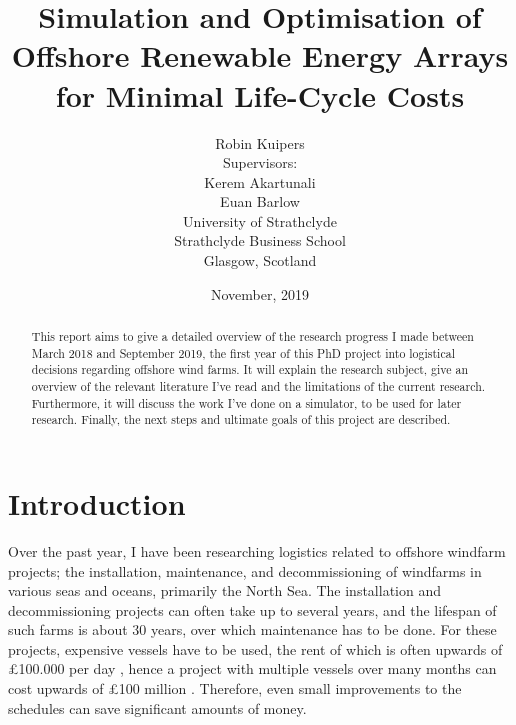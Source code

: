 \documentclass[a4paper,12pt]{article}
\begin{document}
\title{Simulation and Optimisation of Offshore Renewable Energy Arrays for Minimal Life-Cycle Costs}
\author{Robin Kuipers \\[1cm] Supervisors: \\ Kerem Akartunali \\ Euan Barlow\\[2cm] University of Strathclyde \\ Strathclyde Business School \\ {\small Glasgow, Scotland}}
\date{November, 2019}

\maketitle

\pagebreak

\begin{abstract}
This report aims to give a detailed overview of the research progress I made between March 2018 and September 2019, the first year of this PhD project into logistical decisions regarding offshore wind farms. It will explain the research subject, give an overview of the relevant literature I've read and the limitations of the current research. Furthermore, it will discuss the work I've done on a simulator, to be used for later research. Finally, the next steps and ultimate goals of this project are described. 
\end{abstract}

\pagebreak

\tableofcontents

\pagebreak

\section{Introduction} \label{s:intro}
Over the past year, I have been researching logistics related to offshore windfarm projects; the installation, maintenance, and decommissioning of windfarms in various seas and oceans, primarily the North Sea. The installation and decommissioning projects can often take up to several years, and the lifespan of such farms is about 30 years, over which maintenance has to be done. For these projects, expensive vessels have to be used, the rent of which is often upwards of \pounds 100.000 per day \cite{barlow2014support}, hence a project with multiple vessels over many months can cost upwards of \pounds 100 million \cite{kaiser2010offshore}. Therefore, even small improvements to the schedules can save significant amounts of money.
\end{document}
